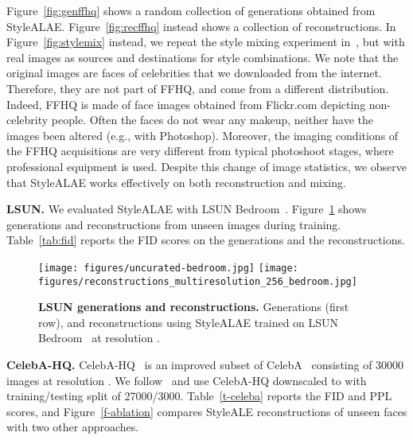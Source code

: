 Figure~\ref{fig:genffhq} shows a random collection of generations obtained from
StyleALAE. Figure~\ref{fig:recffhq} instead shows a collection of reconstructions. In Figure~\ref{fig:stylemix} instead, we repeat the style mixing experiment in~\cite{Karras2019}, but with real images as sources and destinations for style combinations. We note that the original images are faces of celebrities that we downloaded from the internet. Therefore, they are not part of FFHQ, and come from a different distribution. Indeed, FFHQ is made of face images obtained from Flickr.com depicting non-celebrity people. Often the faces do not wear any makeup, neither have the images been altered (e.g., with Photoshop). Moreover, the imaging conditions of the FFHQ acquisitions are very different from typical photoshoot stages, where professional equipment is used. Despite this change of image statistics, we observe that StyleALAE works effectively on both reconstruction and mixing.


\textbf{LSUN.} We evaluated StyleALAE with LSUN Bedroom~\cite{yu2015lsun}.  Figure~\ref{fig:genbed} shows generations and reconstructions from unseen images during training. Table~\ref{tab:fid} reports the FID scores on the generations and the reconstructions.
\begin{figure}[t!]
\begin{center}




\texttt{[image: figures/uncurated-bedroom.jpg]}
\texttt{[image: figures/reconstructions\_multiresolution\_256\_bedroom.jpg]}

\end{center}
\vspace{-5mm}
\caption{\textbf{LSUN generations and reconstructions.} Generations (first row), and reconstructions using StyleALAE trained on LSUN Bedroom~\cite{yu2015lsun} at resolution .}
\label{fig:genbed}
\vspace{-4mm}
\end{figure}










\textbf{CelebA-HQ.} CelebA-HQ~\cite{karras2017progressive} is an improved subset of CelebA~\cite{liu2015deep} consisting of 30000 images at resolution . We follow~\cite{heljakka2018pioneer, heljakka2019towards, Kingma2018, karras2017progressive} and use CelebA-HQ downscaled to  with training/testing split of 27000/3000. Table~\ref{t-celeba} reports the FID and PPL scores, and Figure~\ref{f-ablation} compares StyleALE reconstructions of unseen faces with two other approaches.

